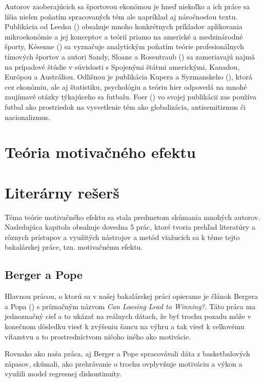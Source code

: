 \documentclass[
  digital, %
  oneside, %
  notable,   %
  lof,     %
  lot,     %
]{fithesis3}
\begin{document}
	Autorov zaoberajúcich sa športovou ekonómou je hneď niekoľko a ich práce sa líšia nielen poňatím spracovaných tém ale napríklad aj náročnosťou textu. Publikácia od Leedsa (\citeyear{leeds2018}) obsahuje mnoho konkrétnych príkladov aplikovania mikroekonómie a jej konceptov a teórií priamo na americké a medzinárodné športy, Késenne (\citeyear{kesenne2014}) sa vyznačuje analytickým poňatím teórie profesionálnych tímových športov a autori Sandy, Sloane a Rosentraub (\citeyear{sandy2004}) sa zameriavajú najmä na prípadové štúdie v súvislosti s Spojenými štátmi americkými, Kanadou, Európou a Austráliou. Odlišnou je publikácia Kupera a Syzmanskeho (\citeyear{kuper2009}), ktorá cez ekonómiu, ale aj štatistiku, psychológiu a teóriu hier odpovedá na mnohé zaujímavé otázky týkajúceho sa futbalu. Foer (\citeyear{foer2004}) vo svojej publikácii zas používa futbal ako prostriedok na vysvetlenie tém ako globalizácia, antisemitizmus či nacionalizmus.
	
	\chapter{Teória motivačného efektu}
	

	\chapter{Literárny rešerš}
	Téma teórie motivačného efektu sa stala predmetom skúmania mnohých autorov. Nasledujúca kapitola obsahuje dovedna 5 prác, ktoré tvoria prehľad literatúry a rôznych prístupov a využitých nástrojov a metód viažucich sa k téme tejto bakalárskej práce, tzn. motivačnému efektu. 
	
		\section{Berger a Pope}
		\label{sec:Berger}
		Hlavnou prácou, o ktorú sa v našej bakalárskej práci opierame je článok Bergera a Popa (\citeyear{berger2011}) s príznačným názvom \textit{Can Loosing Lead to Winning?}. Táto práca ma jednoznačný cieľ a to ukázať na reálnych dátach, že byť trochu pozadu môže v konečnom dôsledku viesť k zvýšeniu šancu na výhru a tak viesť k celkovému víťazstvu a to prostredníctvom ničoho iného ako motivácie.
		
		Rovnako ako naša práca, aj Berger a Pope spracovávali dáta z basketbalových zápasov, skúmali, ako prehrávanie o trochu ovplyvňuje motiváciu a výkon a využili model regresnej diskontinuity. 
		
\end{document}
